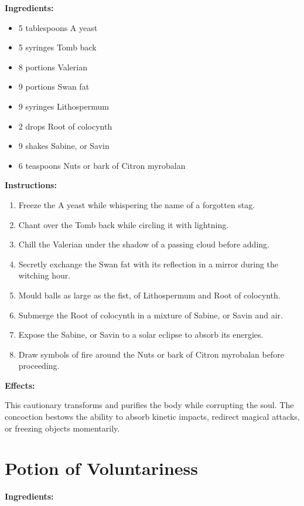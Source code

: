 \documentclass{article}
\begin{document}
\textbf{Ingredients:}

\begin{itemize}
  \item 5 tablespoons A yeast
  \item 5 syringes Tomb back
  \item 8 portions Valerian
  \item 9 portions Swan fat
  \item 9 syringes Lithospermum
  \item 2 drops Root of colocynth
  \item 9 shakes Sabine, or Savin
  \item 6 teaspoons Nuts or bark of Citron myrobalan
\end{itemize}

\textbf{Instructions:}

\begin{enumerate}
  \item Freeze the A yeast while whispering the name of a forgotten stag.
  \item Chant over the Tomb back while circling it with lightning.
  \item Chill the Valerian under the shadow of a passing cloud before adding.
  \item Secretly exchange the Swan fat with its reflection in a mirror during the witching hour.
  \item Mould balls as large as the fist, of Lithospermum and Root of colocynth.
  \item Submerge the Root of colocynth in a mixture of Sabine, or Savin and air.
  \item Expose the Sabine, or Savin to a solar eclipse to absorb its energies.
  \item Draw symbols of fire around the Nuts or bark of Citron myrobalan before proceeding.
\end{enumerate}

\textbf{Effects:}

This cautionary transforms and purifies the body while corrupting the soul. The concoction bestows the ability to absorb kinetic impacts, redirect magical attacks, or freezing objects momentarily.

\newpage
\section*{Potion of Voluntariness}

\textbf{Ingredients:}
\end{document}
